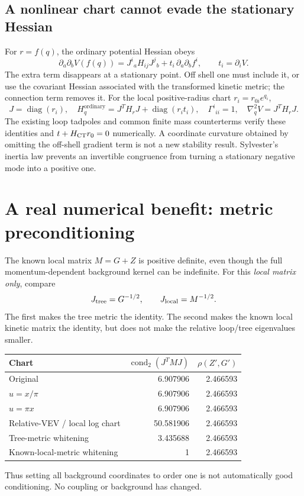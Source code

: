 \documentclass[11pt]{article}
\newcommand{\diag}{\operatorname{diag}}
\newcommand{\cond}{\operatorname{cond}}
\begin{document}
\subsection{A nonlinear chart cannot evade the stationary Hessian}
For $r=f(q)$, the ordinary potential Hessian obeys
\begin{equation}
 \partial_a\partial_b V(f(q))
 =J^i{}_a H_{ij}J^j{}_b+t_i\,\partial_a\partial_b f^i,\qquad
 t_i=\partial_iV.
\end{equation}
The extra term disappears at a stationary point. Off shell one must
include it, or use the covariant Hessian associated with the transformed
kinetic metric; the connection term removes it.
For the local positive-radius chart $r_i=r_{0i}e^{q_i}$,
\begin{equation}
 J=\diag(r_i),\quad
 H^{\mathrm{ordinary}}_{q}=J^TH_rJ+\diag(r_it_i),\quad
 \Gamma^i{}_{ii}=1,\quad
 \nabla_q^2V=J^TH_rJ.
\end{equation}
The existing loop tadpoles and common finite mass counterterms verify
these identities and $t+H_{\rm CT}r_0=0$ numerically. A coordinate
curvature obtained by omitting the off-shell gradient term is not a
new stability result. Sylvester's inertia law prevents an invertible
congruence from turning a stationary negative mode into a positive one.

\section{A real numerical benefit: metric preconditioning}
The known local matrix $M=G+Z$ is positive definite, even though the
full momentum-dependent background kernel can be indefinite.
For this \emph{local matrix only}, compare
\begin{equation}
 J_{\rm tree}=G^{-1/2},\qquad J_{\rm local}=M^{-1/2}.
\end{equation}
The first makes the tree metric the identity. The second makes the
known local kinetic matrix the identity, but does not make the
relative loop/tree eigenvalues smaller.

\begin{center}
\begin{tabular}{lrr}
\toprule
Chart & $\cond_2(J^TMJ)$ & $\rho(Z',G')$\\
\midrule
Original & 6.907906 & 2.466593\\
$u=x/\pi$ & 6.907906 & 2.466593\\
$u=\pi x$ & 6.907906 & 2.466593\\
Relative-VEV / local log chart & 50.581906 & 2.466593\\
Tree-metric whitening & 3.435688 & 2.466593\\
Known-local-metric whitening & 1 & 2.466593\\
\bottomrule
\end{tabular}
\end{center}
Thus setting all background coordinates to order one is not
automatically good conditioning. No coupling or background has changed.
\end{document}
